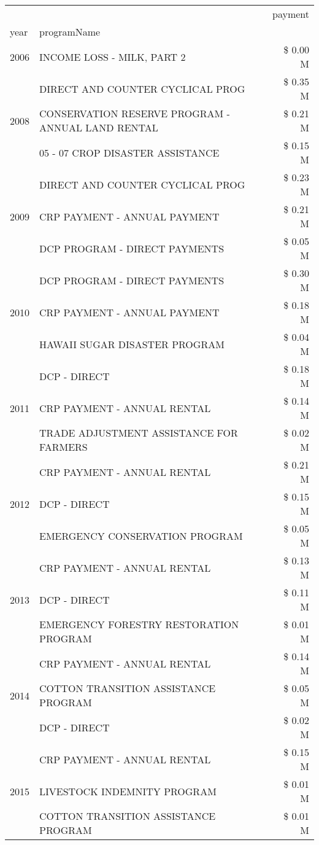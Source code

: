 \begin{tabular}{llr}
\toprule
 &  & payment \\
year & programName &  \\
\midrule
2006 & INCOME LOSS - MILK, PART 2 & \$ 0.00 M \\
\cline{1-3}
\multirow[t]{3}{*}{2008} & DIRECT AND COUNTER CYCLICAL PROG & \$ 0.35 M \\
 & CONSERVATION RESERVE PROGRAM - ANNUAL LAND RENTAL & \$ 0.21 M \\
 & 05 - 07 CROP DISASTER ASSISTANCE & \$ 0.15 M \\
\cline{1-3}
\multirow[t]{3}{*}{2009} & DIRECT AND COUNTER CYCLICAL PROG & \$ 0.23 M \\
 & CRP PAYMENT - ANNUAL PAYMENT & \$ 0.21 M \\
 & DCP PROGRAM - DIRECT PAYMENTS & \$ 0.05 M \\
\cline{1-3}
\multirow[t]{3}{*}{2010} & DCP PROGRAM - DIRECT PAYMENTS & \$ 0.30 M \\
 & CRP PAYMENT - ANNUAL PAYMENT & \$ 0.18 M \\
 & HAWAII SUGAR DISASTER PROGRAM & \$ 0.04 M \\
\cline{1-3}
\multirow[t]{3}{*}{2011} & DCP - DIRECT & \$ 0.18 M \\
 & CRP PAYMENT - ANNUAL RENTAL & \$ 0.14 M \\
 & TRADE ADJUSTMENT ASSISTANCE FOR FARMERS & \$ 0.02 M \\
\cline{1-3}
\multirow[t]{3}{*}{2012} & CRP PAYMENT - ANNUAL RENTAL & \$ 0.21 M \\
 & DCP - DIRECT & \$ 0.15 M \\
 & EMERGENCY CONSERVATION PROGRAM & \$ 0.05 M \\
\cline{1-3}
\multirow[t]{3}{*}{2013} & CRP PAYMENT - ANNUAL RENTAL & \$ 0.13 M \\
 & DCP - DIRECT & \$ 0.11 M \\
 & EMERGENCY FORESTRY RESTORATION PROGRAM & \$ 0.01 M \\
\cline{1-3}
\multirow[t]{3}{*}{2014} & CRP PAYMENT - ANNUAL RENTAL & \$ 0.14 M \\
 & COTTON TRANSITION ASSISTANCE PROGRAM & \$ 0.05 M \\
 & DCP - DIRECT & \$ 0.02 M \\
\cline{1-3}
\multirow[t]{3}{*}{2015} & CRP PAYMENT - ANNUAL RENTAL & \$ 0.15 M \\
 & LIVESTOCK INDEMNITY PROGRAM & \$ 0.01 M \\
 & COTTON TRANSITION ASSISTANCE PROGRAM & \$ 0.01 M \\

\end{tabular}
